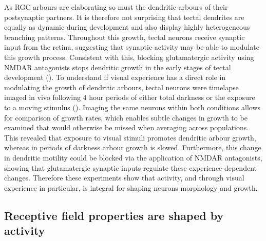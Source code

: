 As RGC arbours are elaborating so must the dendritic arbours of their postsynaptic partners. It is therefore not surprising that tectal dendrites are equally as dynamic during development and also display highly heterogeneous branching patterns. Throughout this growth, tectal neurons receive synaptic input from the retina, suggesting that synaptic activity may be able to modulate this growth process. Consistent with this, blocking glutamatergic activity using NMDAR antagonists stops dendritic growth in the early stages of tectal development (\cite{Rajan1998GlutamateVivo}). To understand if visual experience has a direct role in modulating the growth of dendritic arbours, tectal neurons were timelapse imaged in vivo following 4 hour periods of either total darkness or the exposure to a moving stimulus (\cite{Sin2002DendriteGTPases}).   Imaging the same neurons within both conditions allows for comparison of growth rates, which enables subtle changes in growth to be examined that would otherwise be missed when averaging across populations. This revealed that exposure to visual stimuli promotes dendritic arbour growth, whereas in periods of darkness arbour growth is slowed. Furthermore, this change in dendritic motility could be blocked via the application of NMDAR antagonists, showing that glutamatergic synaptic inputs regulate these  experience-dependent changes.  Therefore these experiments show that activity, and through visual experience in particular, is integral for shaping neurons morphology and growth. 


\subsection{Receptive field properties are shaped by activity}
